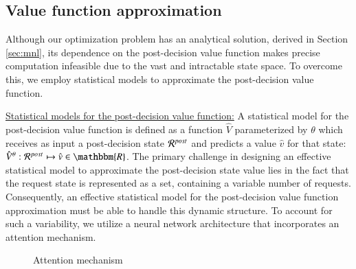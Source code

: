 \subsection{Value function approximation}
\label{sec:statistical_models}
Although our optimization problem has an analytical solution, derived in Section \ref{sec:mnl}, its dependence on the post-decision value function makes precise computation infeasible due to the vast and intractable state space. To overcome this, we employ statistical models to approximate the post-decision value function.

\noindent\underline{Statistical models for the post-decision value function:} A statistical model for the post-decision value function is defined as a function $\hat{V}$ parameterized by $\theta$ which receives as input a post-decision state $\mathcal{R}^{post}\hspace{0.05em}$ and predicts a value $\hat{v}$ for that state: $\hat{V}^\theta: \mathcal{R}^{post}\hspace{0.05em} \mapsto \hat{v} \in \mathbbm{R}$. The primary challenge in designing an effective statistical model to approximate the post-decision state value lies in the fact that the request state is represented as a set, containing a variable number of requests. Consequently, an effective statistical model for the post-decision value function approximation must be able to handle this dynamic structure. To account for such a variability, we utilize a neural network architecture that incorporates an attention mechanism.

\begin{figure}[b]
\centering
{}
\caption{\textnormal{Attention mechanism}}
\label{fig:tikz_diagram}
\end{figure}

